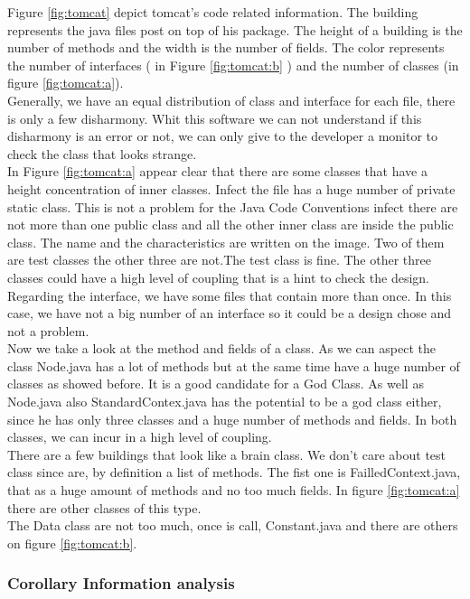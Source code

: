 \documentclass[]{usiinfbachelorproject}
\begin{document}
Figure \ref{fig:tomcat} depict tomcat's code related information. The building represents the java files post on top of his package. The height of a building is the number of methods and the width is the number of fields. The color represents the number of interfaces ( in Figure \ref{fig:tomcat:b} ) and  the number of classes (in figure  \ref{fig:tomcat:a}).\\
Generally, we have an equal distribution of class and interface for each file, there is only a few disharmony. Whit this software we can not understand if this disharmony is an error or not, we can only give to the developer a monitor to check the class that looks strange.\\
In Figure \ref{fig:tomcat:a} appear clear that there are some classes that have a height concentration of inner classes. Infect the file has a huge number of private static class. This is not a problem for the Java Code Conventions \cite{oracle} infect there are not more than one public class and all the other inner class are inside the public class. The name and the characteristics are written on the image. Two of them are test classes the other three are not.The test class is fine. The other three classes could have a high level of coupling that is a hint to check the design. Regarding the interface, we have some files that contain more than once. In this case, we have not a big number of an interface so it could be a design chose and not a problem.\\
Now we take a look at the method and fields of a class. As we can aspect the class Node.java has a lot of methods  but at the same time have a huge number of classes as  showed before. It is a good candidate for a God Class. As well as Node.java also StandardContex.java has the potential to be a god class either, since he has only three classes and a huge number of methods and fields. In both classes, we can incur in a high level of coupling.\\
There are a few buildings that look like a brain class. We don't care about test class since are, by definition a list of methods. The fist one is FailledContext.java, that as a huge amount of methods and no too much fields. In figure \ref{fig:tomcat:a} there are other classes of this type.\\
The Data class are not too much, once is call, Constant.java and there are others on figure \ref{fig:tomcat:b}.



\subsubsection{Corollary Information analysis}
\end{document}
